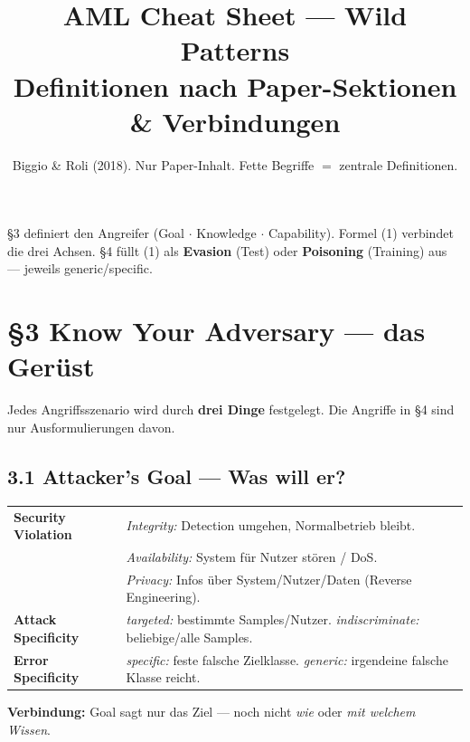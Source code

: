 \documentclass[10pt,a4paper]{article}
\title{\vspace{-1.25em}\textbf{AML Cheat Sheet --- Wild Patterns}\\[0.1em]
\large Definitionen nach Paper-Sektionen \& Verbindungen}
\author{\small Biggio \& Roli (2018). Nur Paper-Inhalt. Fette Begriffe $=$ zentrale Definitionen.}
\date{}
\begin{document}
\maketitle
\vspace{-1.65em}

\begin{tcolorbox}[chain, title=Die Verbindung in einem Satz]
§3 definiert den Angreifer (Goal $\cdot$ Knowledge $\cdot$ Capability).
Formel (1) verbindet die drei Achsen.
§4 f\"ullt (1) als \textbf{Evasion} (Test) oder \textbf{Poisoning} (Training) aus --- jeweils generic/specific.
\end{tcolorbox}

\vspace{0.15em}
\begin{center}
\end{center}

\section{\S3 Know Your Adversary --- das Ger\"ust}
Jedes Angriffsszenario wird durch \textbf{drei Dinge} festgelegt. Die Angriffe in §4 sind nur Ausformulierungen davon.

\subsection{3.1 Attacker's Goal --- Was will er?}
\begin{tabularx}{\textwidth}{@{}>{\bfseries\small}l >{\small}X@{}}
\toprule
Security Violation &
  \emph{Integrity:} Detection umgehen, Normalbetrieb bleibt.\\
  & \emph{Availability:} System f\"ur Nutzer st\"oren / DoS.\\
  & \emph{Privacy:} Infos \"uber System/Nutzer/Daten (Reverse Engineering).\\
\midrule
Attack Specificity &
  \emph{targeted:} bestimmte Samples/Nutzer.\quad
  \emph{indiscriminate:} beliebige/alle Samples.\\
\midrule
Error Specificity &
  \emph{specific:} feste falsche Zielklasse.\quad
  \emph{generic:} irgendeine falsche Klasse reicht.\\
\bottomrule
\end{tabularx}
\vspace{0.1em}
{\small\textbf{Verbindung:} Goal sagt nur das Ziel --- noch nicht \emph{wie} oder \emph{mit welchem Wissen}.}
\end{document}
